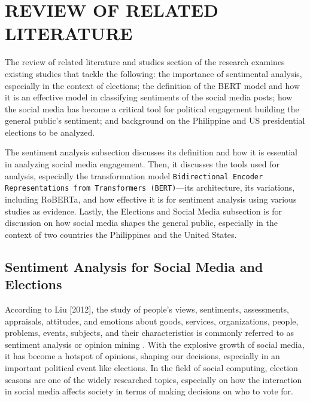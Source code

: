 \chapter{REVIEW OF RELATED LITERATURE}
The review of related literature and studies section of the research examines existing studies that tackle the following: the importance of sentimental analysis, especially in the context of elections; the definition of the BERT model and how it is an effective model in classifying sentiments of the social media posts; how the social media has become a critical tool for political engagement building the general public’s sentiment; and background on the Philippine and US presidential elections to be analyzed. 

The sentiment analysis subsection discusses its definition and how it is essential in analyzing social media engagement. Then, it discusses the tools used for analysis, especially the transformation model \texttt{Bidirectional Encoder Representations from Transformers (BERT)}—its architecture, its variations, including RoBERTa, and how effective it is for sentiment analysis using various studies as evidence. Lastly, the Elections and Social Media subsection is for discussion on how social media shapes the general public, especially in the context of two countries the Philippines and the United States.

\section{Sentiment Analysis for Social Media and Elections}
According to Liu [2012], the study of people's views, sentiments, assessments, appraisals, attitudes, and emotions about goods, services, organizations, people, problems, events, subjects, and their characteristics is commonly referred to as sentiment analysis or opinion mining \cite{RRL_Liu-2012}. With the explosive growth of social media, it has become a hotspot of opinions, shaping our decisions, especially in an important political event like elections. In the field of social computing, election seasons are one of the widely researched topics, especially on how the interaction in social media affects society in terms of making decisions on who to vote for. 

